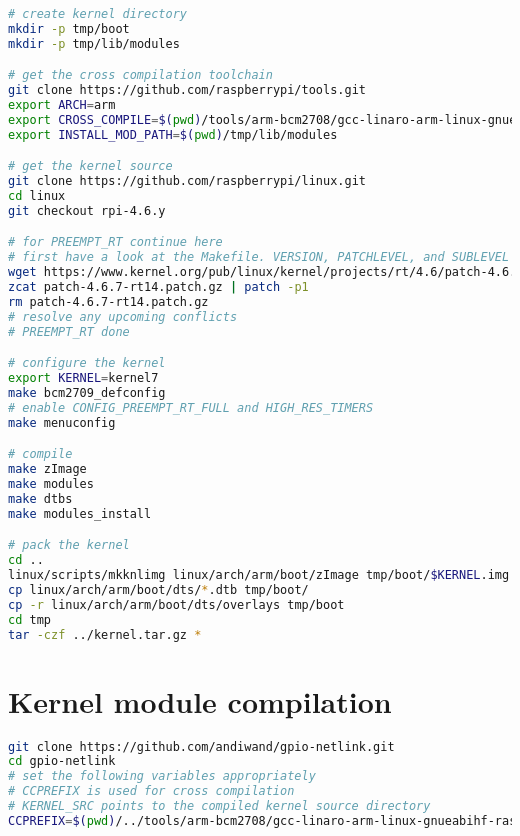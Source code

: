 \begin{lstlisting}[label=lst:kernel, language=bash, caption=Kernel compilation]
# create kernel directory
mkdir -p tmp/boot
mkdir -p tmp/lib/modules

# get the cross compilation toolchain
git clone https://github.com/raspberrypi/tools.git
export ARCH=arm
export CROSS_COMPILE=$(pwd)/tools/arm-bcm2708/gcc-linaro-arm-linux-gnueabihf-raspbian/bin/arm-linux-gnueabihf-
export INSTALL_MOD_PATH=$(pwd)/tmp/lib/modules

# get the kernel source
git clone https://github.com/raspberrypi/linux.git
cd linux
git checkout rpi-4.6.y

# for PREEMPT_RT continue here
# first have a look at the Makefile. VERSION, PATCHLEVEL, and SUBLEVEL define the kernel version.
wget https://www.kernel.org/pub/linux/kernel/projects/rt/4.6/patch-4.6.7-rt14.patch.gz
zcat patch-4.6.7-rt14.patch.gz | patch -p1
rm patch-4.6.7-rt14.patch.gz
# resolve any upcoming conflicts
# PREEMPT_RT done

# configure the kernel
export KERNEL=kernel7
make bcm2709_defconfig
# enable CONFIG_PREEMPT_RT_FULL and HIGH_RES_TIMERS
make menuconfig

# compile
make zImage
make modules
make dtbs
make modules_install

# pack the kernel
cd ..
linux/scripts/mkknlimg linux/arch/arm/boot/zImage tmp/boot/$KERNEL.img
cp linux/arch/arm/boot/dts/*.dtb tmp/boot/
cp -r linux/arch/arm/boot/dts/overlays tmp/boot
cd tmp
tar -czf ../kernel.tar.gz *
\end{lstlisting}

\section{Kernel module compilation}

\begin{lstlisting}[label=lst:kernel_module, language=bash, caption=Kernel module compilation]
git clone https://github.com/andiwand/gpio-netlink.git
cd gpio-netlink
# set the following variables appropriately
# CCPREFIX is used for cross compilation
# KERNEL_SRC points to the compiled kernel source directory
CCPREFIX=$(pwd)/../tools/arm-bcm2708/gcc-linaro-arm-linux-gnueabihf-raspbian/bin/arm-linux-gnueabihf- KERNEL_SRC=$(pwd)/../linux make
\end{lstlisting}
